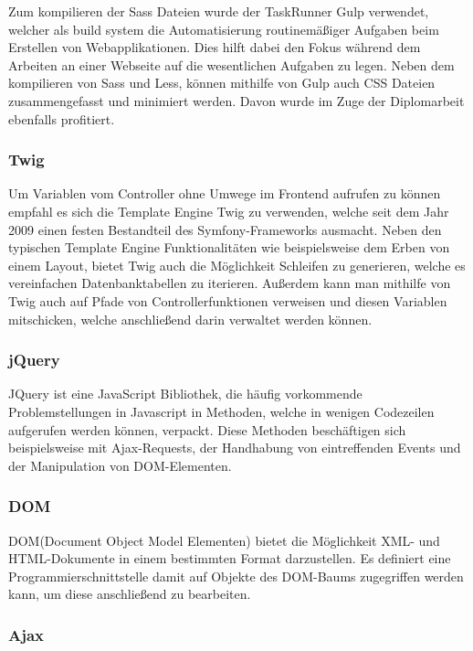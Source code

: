 Zum kompilieren der Sass Dateien wurde der TaskRunner Gulp verwendet, welcher als build system die Automatisierung routinemäßiger Aufgaben beim Erstellen von Webapplikationen. Dies hilft dabei den Fokus während dem Arbeiten an einer Webseite auf die wesentlichen Aufgaben zu legen. Neben dem kompilieren von Sass und Less, können mithilfe von Gulp auch CSS Dateien zusammengefasst und minimiert werden. Davon wurde im Zuge der Diplomarbeit ebenfalls profitiert.

    \subsubsection{Twig}

Um Variablen vom Controller ohne Umwege im Frontend aufrufen zu können empfahl es sich die Template Engine Twig zu verwenden, welche seit dem Jahr 2009 einen festen Bestandteil des Symfony-Frameworks ausmacht. Neben den typischen Template Engine Funktionalitäten wie beispielsweise dem Erben von einem Layout, bietet Twig auch die Möglichkeit Schleifen zu generieren, welche es vereinfachen Datenbanktabellen zu iterieren. Außerdem kann man mithilfe von Twig auch auf Pfade von Controllerfunktionen verweisen und diesen Variablen mitschicken, welche anschließend darin verwaltet werden können.

    \subsubsection{jQuery}
    
JQuery ist eine JavaScript Bibliothek, die häufig vorkommende Problemstellungen in Javascript in Methoden, welche in wenigen Codezeilen aufgerufen werden können, verpackt. Diese Methoden beschäftigen sich beispielsweise mit Ajax-Requests, der Handhabung von eintreffenden Events und der Manipulation von DOM-Elementen.
    
    \subsubsection{DOM}
    
DOM(Document Object Model Elementen) bietet die Möglichkeit XML- und HTML-Dokumente in einem bestimmten Format darzustellen. Es definiert eine Programmierschnittstelle damit auf Objekte des DOM-Baums zugegriffen werden kann, um diese anschließend zu bearbeiten.
    
    \subsubsection{Ajax}
    
